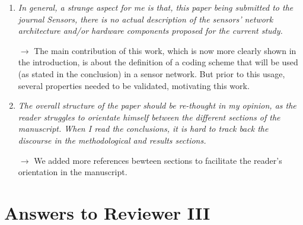 \documentclass[10pt]{article}
\begin{document}
\begin{enumerate}
\item \emph{In general, a strange aspect for me is that, this paper being submitted to the journal Sensors, there is no actual description of the sensors’ network architecture and/or hardware components proposed for the current study.}

$\rightarrow$ The main contribution of this work, which is now more clearly shown in the introduction, is about the definition of a coding scheme that will be used (as stated in the conclusion) in a sensor network. But prior to this usage, several properties needed to be validated, motivating this work.

\item \emph{The overall structure of the paper should be re-thought in my opinion, as the reader struggles to orientate himself between the different sections of the manuscript. When I read the conclusions, it is hard to track back the discourse in the methodological and results sections.}

$\rightarrow$ We added more references bewteen sections to facilitate the reader's orientation in the manuscript.

\end{enumerate}


\section{Answers to Reviewer III}
\end{document}

